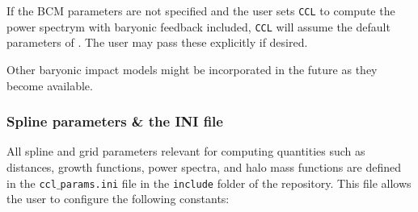 \documentclass[\docopts]{\docclass}
\newcommand{\ccl}{{\tt CCL}\xspace}
\begin{document}
If the BCM parameters are not specified and the user sets \ccl to compute the power spectrym with baryonic feedback included, \ccl will assume the default parameters of \citet{Schneider15}. The user may pass these explicitly if desired. 

Other baryonic impact models might be incorporated in the future as they become available.

\subsubsection{Spline parameters \& the INI file}

All spline and grid parameters relevant for computing quantities such as distances, growth functions, power spectra, and halo mass functions are defined in the {\tt ccl$\_$params.ini} file in the {\tt include} folder of the repository. This file allows the user to configure the following constants:
\end{document}

